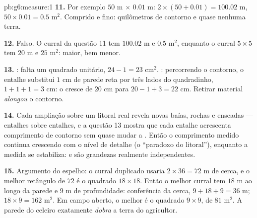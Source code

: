 \begin{solution}{pb:g6:measure:1}
\textbf{11.} Por exemplo $50$ m $\times$ $0.01$ m: 
$2 \times (50 + 0.01) = 100.02$ m,  $50 \times 0.01 = 0.5$ m$^2$.
Comprido e fino: quilômetros de contorno e quase nenhuma terra.

\textbf{12.} Falso. O curral da questão 11 tem  $100.02$ m e
 $0.5$ m$^2$, enquanto o curral $5 \times 5$ tem  $20$ m e
 $25$ m$^2$:  maior,  bem menor.

\textbf{13.} : falta um quadrado unitário, $24 - 1 = 23$ cm$^2$.
: percorrendo o contorno, o entalhe substitui $1$ cm de parede
reta por três lados do quadradinho, $1 + 1 + 1 = 3$ cm: o 
cresce de $20$ cm para $20 - 1 + 3 = 22$ cm. Retirar material
\emph{alongou} o contorno.

\textbf{14.} Cada ampliação sobre um litoral real revela novas baías,
rochas e enseadas --- entalhes sobre entalhes, e a questão 13 mostra
que cada entalhe acrescenta comprimento de contorno sem quase mudar a
. Então o comprimento medido continua crescendo com o nível de
detalhe (o ``paradoxo do litoral''), enquanto a  medida se
estabiliza:  e  são grandezas realmente independentes.

\textbf{15.} Argumento do espelho: o curral duplicado usaria
$2 \times 36 = 72$ m de cerca, e o melhor retângulo de  $72$ é
o quadrado $18 \times 18$. Então o melhor curral tem $18$ m ao longo da
parede e $9$ m de profundidade: conferência da cerca,
$9 + 18 + 9 = 36$ m;  $18 \times 9 = 162$ m$^2$. Em campo aberto, o
melhor é o quadrado $9 \times 9$, de  $81$ m$^2$. A parede do
celeiro exatamente \emph{dobra} a terra do agricultor.
\end{solution}
